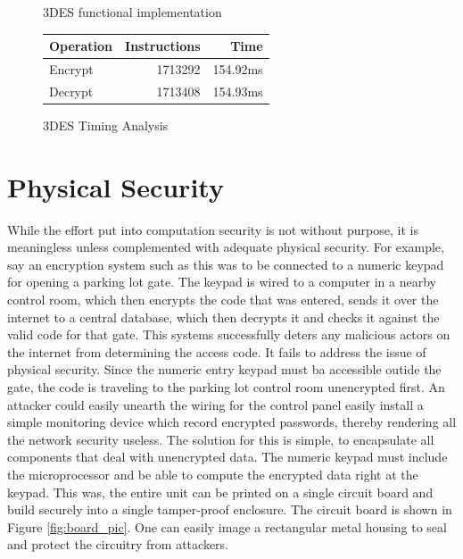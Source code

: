 \documentclass[conference]{IEEEtran}
\begin{document}
\begin{figure}[ht]
  \centering
  
  \caption{3DES functional implementation}
  \label{fig:3des_diff}
\end{figure}

\begin{figure}[ht]
  \centering
\begin{tabular}{ | l r r | }
  \hline
  Operation & Instructions & Time \\ 
  \hline\hline
  Encrypt & 1713292 & 154.92ms \\  
  Decrypt & 1713408 & 154.93ms \\    
  \hline
\end{tabular}
  \caption{3DES Timing Analysis}
  \label{fig:3des_timing}
\end{figure}

\section{Physical Security}
While the effort put into computation security is not without purpose, it is meaningless unless complemented with adequate physical security. For example, say an encryption system such as this was to be connected to a numeric keypad for opening a parking lot gate. The keypad is wired to a computer in a nearby control room, which then encrypts the code that was entered, sends it over the internet to a central database, which then decrypts it and checks it against the valid code for that gate. This systems successfully deters any malicious actors on the internet from determining the access code. It fails to address the issue of physical security. Since the numeric entry keypad must ba accessible outide the gate, the code is traveling to the parking lot control room unencrypted first. An attacker could easily unearth the wiring for the control panel easily install a simple monitoring device which record encrypted passwords, thereby rendering all the network security useless. The solution for this is simple, to encapsulate all components that deal with unencrypted data. The numeric keypad must include the microprocessor and be able to compute the encrypted data right at the keypad. This was, the entire unit can be printed on a single circuit board and build securely into a single tamper-proof enclosure. The circuit board is shown in Figure \ref{fig:board_pic}. One can easily image a rectangular metal housing to seal and protect the circuitry from attackers.
\end{document}
